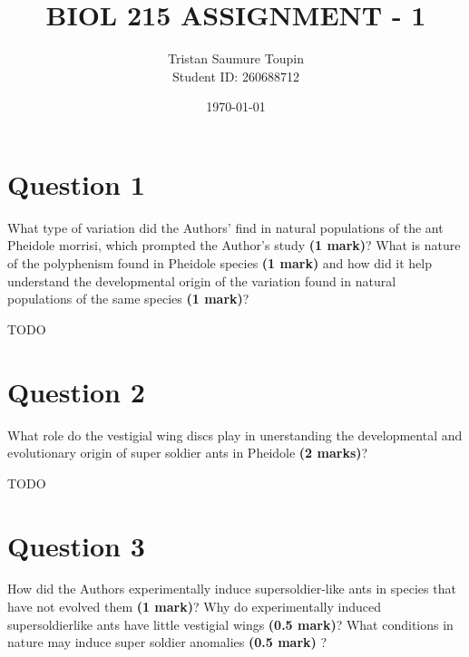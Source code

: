 \documentclass[letterpaper,12pt]{article}
\newenvironment{myindentpar}[1]%
{\begin{list}{}%
          {\setlength{\leftmargin}{#1}}%
          \item[]%
}
{\end{list}}
\begin{document}
\title{BIOL 215 ASSIGNMENT - 1}
\author{Tristan Saumure Toupin \\ Student ID: 260688712}
\date{\today}
\maketitle


\section{Question 1}

What type of variation did the Authors’ find in natural populations of the ant Pheidole morrisi, which prompted the Author’s study \textbf{(1 mark)}? What is nature of the polyphenism found in Pheidole species \textbf{(1 mark)} and how did it help understand the developmental origin of the variation found in natural populations of the same species \textbf{(1 mark)}?
\vspace*{20px}

\begin{myindentpar}{0.5cm}
TODO
\end{myindentpar}



\section{Question 2}

What role do the vestigial wing discs play in unerstanding the developmental and evolutionary origin of super soldier ants in Pheidole \textbf{(2 marks)}?
\vspace*{20px}

\begin{myindentpar}{0.5cm}
TODO
\end{myindentpar}



\section{Question 3}

How did the Authors experimentally induce supersoldier-like ants in species that have not evolved them \textbf{(1 mark)}? Why do experimentally induced supersoldierlike ants have little vestigial wings \textbf{(0.5 mark)}? What conditions in nature may induce super soldier anomalies \textbf{(0.5 mark)} ?
\vspace*{20px}

\begin{myindentpar}{0.5cm}

\end{myindentpar}
\end{document}

